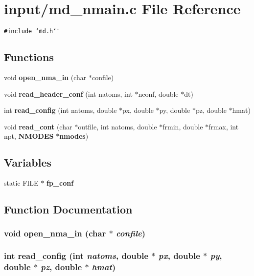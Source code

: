 \section{input/md\_\-nmain.c File Reference}
\label{md__nmain_8c}
{\tt \#include \char`\"{}md.h\char`\"{}}\par
\subsection*{Functions}
\begin{CompactItemize}
\item 
void {\bf open\_\-nma\_\-in} (char $\ast$confile)
\item 
void {\bf read\_\-header\_\-conf} (int natoms, int $\ast$nconf, double $\ast$dt)
\item 
int {\bf read\_\-config} (int natoms, double $\ast$px, double $\ast$py, double $\ast$pz, double $\ast$hmat)
\item 
void {\bf read\_\-cont} (char $\ast$outfile, int natoms, double $\ast$frmin, double $\ast$frmax, int npt, {\bf NMODES} $\ast${\bf nmodes})
\end{CompactItemize}
\subsection*{Variables}
\begin{CompactItemize}
\item 
static FILE $\ast$ {\bf fp\_\-conf}
\end{CompactItemize}


\subsection{Function Documentation}
\subsubsection{\setlength{\rightskip}{0pt plus 5cm}void open\_\-nma\_\-in (char $\ast$ {\em confile})}\label{md__nmain_8c_1e3af45e4a047a6fff7182329cb90612}


\subsubsection{\setlength{\rightskip}{0pt plus 5cm}int read\_\-config (int {\em natoms}, double $\ast$ {\em px}, double $\ast$ {\em py}, double $\ast$ {\em pz}, double $\ast$ {\em hmat})}\label{md__nmain_8c_d763faa792b83e1275d5b407bb1a3f80}


